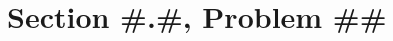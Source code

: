 \documentclass{article}
\author{Nathan Stouffer}
\begin{document}
\section*{Section #.#, Problem ##}

\clearpage
\header
\end{document}
